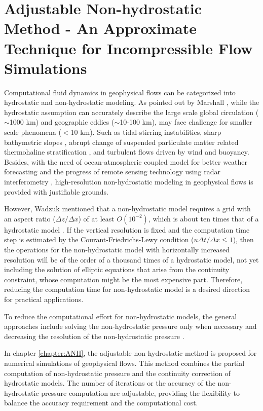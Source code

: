 \normalsize
\section{Adjustable Non-hydrostatic Method - An Approximate Technique for Incompressible Flow Simulations}
\label{chapter:Introduction-ANH}
Computational fluid dynamics in geophysical flows can be categorized into hydrostatic and non-hydrostatic modeling. As pointed out by Marshall \cite{Marshall1997}, while the hydrostatic assumption can accurately describe the large scale global circulation ($\sim$1000 km) and geographic eddies ($\sim$10-100 km), may face challenge for smaller scale phenomena ($<$10 km). Such as tidal-stirring instabilities, sharp bathymetric slopes \cite{Friedrichs1996}, abrupt change of suspended particulate matter related thermohaline stratification \cite{Fain2001}, and turbulent flows driven by wind and buoyancy. Besides, with the need of ocean-atmospheric coupled model for better weather forecasting \cite{Bao1999, wang05} and the progress of remote sensing technology using radar interferometry \cite{Toporkov05}, high-resolution non-hydrostatic modeling in geophysical flows is provided with justifiable grounds.

However, Wadzuk \cite{Wadzuk04} mentioned that a non-hydrostatic model requires a grid with an aspect ratio ($\Delta z /\Delta x$) of at least $O(10^{-2})$, which is about ten times that of a hydrostatic model \cite{Marshall1997}. If the vertical resolution is fixed and the computation time step is estimated by the Courant-Friedrichs-Lewy condition \cite{Courant1967}($u \Delta t/\Delta x \leq 1$), then the operations for the non-hydrostatic model with horizontally increased resolution will be of the order of a thousand times of a hydrostatic model, not yet including the solution of elliptic equations that arise from the continuity constraint, whose computation might be the most expensive part. Therefore, reducing the computation time for non-hydrostatic model is a desired direction for practical applications.   %

To reduce the computational effort for non-hydrostatic models, the general approaches include solving the non-hydrostatic pressure only when necessary \cite{Janjic01} and decreasing the resolution of the non-hydrostatic pressure \cite{Reeuwijk02}.

In chapter \ref{chapter:ANH}, the adjustable non-hydrostatic method is proposed for numerical simulations of geophysical flows. This method combines the partial computation of non-hydrostatic pressure and the continuity correction of hydrostatic models. The number of iterations or the accuracy of the non-hydrostatic pressure computation are adjustable, providing the flexibility to balance the accuracy requirement and the computational cost.

